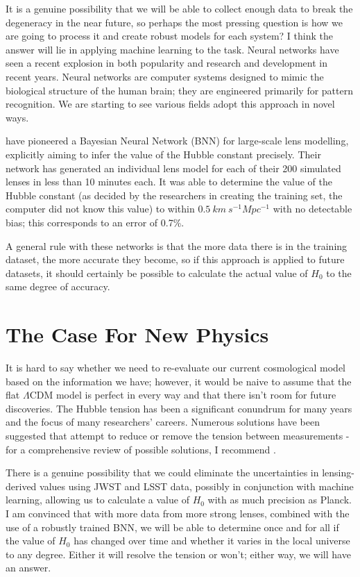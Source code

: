 \documentclass[12pt]{report}
\begin{document}
It is a genuine possibility that we will be able to collect enough data to break the degeneracy in the near future, so perhaps the most pressing question is how we are going to process it and create robust models for each system? I think the answer will lie in applying machine learning to the task. Neural networks have seen a recent explosion in both popularity and research and development in recent years. Neural networks are computer systems designed to mimic the biological structure of the human brain; they are engineered primarily for pattern recognition. We are starting to see various fields adopt this approach in novel ways.

\textcite{WonPark2021} have pioneered a Bayesian Neural Network (BNN) for large-scale lens modelling, explicitly aiming to infer the value of the Hubble constant precisely. Their network has generated an individual lens model for each of their 200 simulated lenses in less than 10 minutes each. It was able to determine the value of the Hubble constant (as decided by the researchers in creating the training set, the computer did not know this value) to within $0.5 \ km \ s^{-1} Mpc^{-1}$ with no detectable bias; this corresponds to an error of 0.7\%. 

A general rule with these networks is that the more data there is in the training dataset, the more accurate they become, so if this approach is applied to future datasets, it should certainly be possible to calculate the actual value of $H_{0}$ to the same degree of accuracy. 

\newpage

\section{The Case For New Physics}

It is hard to say whether we need to re-evaluate our current cosmological model based on the information we have; however, it would be naive to assume that the flat $\Lambda$CDM model is perfect in every way and that there isn't room for future discoveries. The Hubble tension has been a significant conundrum for many years and the focus of many researchers' careers. Numerous solutions have been suggested that attempt to reduce or remove the tension between measurements - for a comprehensive review of possible solutions, I recommend \textcite{DiValentino2021}. 

There is a genuine possibility that we could eliminate the uncertainties in lensing-derived values using JWST and LSST data,  possibly in conjunction with machine learning, allowing us to calculate a value of $H_{0}$ with as much precision as Planck. I am convinced that with more data from more strong lenses, combined with the use of a robustly trained BNN, we will be able to determine once and for all if the value of $H_{0}$ has changed over time and whether it varies in the local universe to any degree. Either it will resolve the tension or won't; either way, we will have an answer. 
\end{document}
